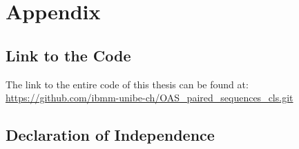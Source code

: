 \chapter{Appendix}

\section{Link to the Code}

The link to the entire code of this thesis can be found at: \\
\url{https://github.com/ibmm-unibe-ch/OAS_paired_sequences_cls.git}

\section{Declaration of Independence}
%
